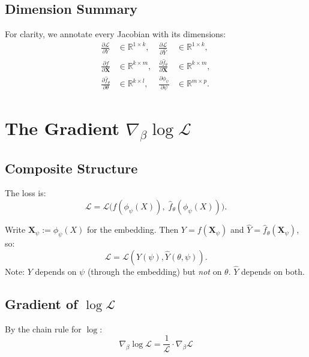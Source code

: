 \documentclass[11pt,a4paper]{article}
\newcommand{\R}{\mathbb{R}}
\newcommand{\calL}{\mathcal{L}}
\newcommand{\bX}{\mathbf{X}}
\begin{document}
\subsection{Dimension Summary}

For clarity, we annotate every Jacobian with its dimensions:
\begin{align*}
\frac{\partial \calL}{\partial Y} &\in \R^{1 \times k}, &
\frac{\partial \calL}{\partial \hat{Y}} &\in \R^{1 \times k}, \\
\frac{\partial f}{\partial \bX} &\in \R^{k \times m}, &
\frac{\partial \hat{f}_\theta}{\partial \bX} &\in \R^{k \times m}, \\
\frac{\partial \hat{f}_\theta}{\partial \theta} &\in \R^{k \times l}, &
\frac{\partial \phi_\psi}{\partial \psi} &\in \R^{m \times p}.
\end{align*}

\newpage
\section{The Gradient $\nabla_\beta \log \calL$}

\subsection{Composite Structure}

The loss is:
\begin{equation}
\calL = \calL\big(f(\phi_\psi(X)),\; \hat{f}_\theta(\phi_\psi(X))\big).
\label{eq:loss}
\end{equation}

Write $\bX_\psi := \phi_\psi(X)$ for the embedding. Then $Y = f(\bX_\psi)$ and $\hat{Y} = \hat{f}_\theta(\bX_\psi)$, so:
\[
\calL = \calL(Y(\psi), \hat{Y}(\theta, \psi)).
\]
Note: $Y$ depends on $\psi$ (through the embedding) but \emph{not} on $\theta$. $\hat{Y}$ depends on both.

\subsection{Gradient of $\log \calL$}

By the chain rule for $\log$:
\begin{equation}
\boxed{\nabla_\beta \log \calL = \frac{1}{\calL} \cdot \nabla_\beta \calL}
\label{eq:log-grad}
\end{equation}
\end{document}

